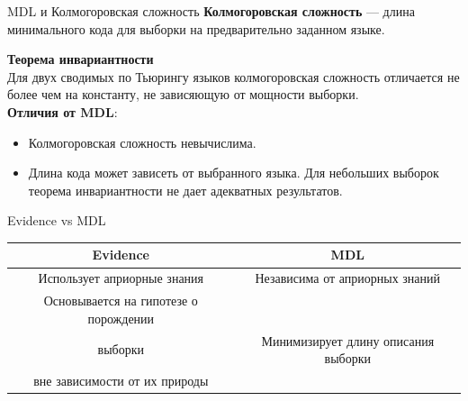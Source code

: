\documentclass[usenames,dvipsnames,10pt,pdf,utf8,russian,aspectratio=43]{beamer}
\begin{document}
\begin{frame}{MDL и Колмогоровская сложность}
\textbf{Колмогоровская сложность} --- длина минимального кода для выборки на предварительно заданном языке.

\textbf{Теорема инвариантности}\\
Для двух сводимых по Тьюрингу языков колмогоровская сложность  отличается не более чем на константу, не зависяющую от мощности выборки.\\

\textbf{Отличия от MDL}:
\begin{itemize}
\item Колмогоровская сложность невычислима.
\item Длина кода может зависеть от выбранного языка. Для небольших выборок теорема инвариантности не дает адекватных результатов.
\end{itemize}
\end{frame}

\begin{frame}{Evidence vs MDL}
\small
\begin{tabular}{ c | c  }
  \hline			
 \bf Evidence & \bf MDL \\
  \hline  
Использует априорные знания &  Независима от априорных знаний \\
  \hline  
Основывается на гипотезе о порождении\\ выборки & Минимизирует длину описания выборки\\ вне зависимости от их природы \\
  \hline  

\end{tabular}
\end{frame}
\end{document}
